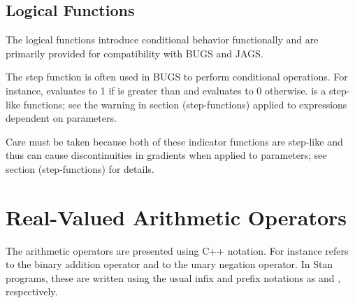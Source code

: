 \begin{description}
{\subsection{Logical Functions}


The logical functions introduce conditional behavior functionally and are primarily provided for compatibility with BUGS and JAGS.


\begin{description}    \end{description}


The step function is often used in BUGS to perform conditional operations.  For instance,  evaluates to 1 if  is greater than  and evaluates to 0 otherwise.  is a step-like functions; see the warning in section \@ref(step-functions) applied to expressions dependent on parameters.


\begin{description}    \end{description}


\begin{description}    \end{description}


Care must be taken because both of these indicator functions are step-like and thus can cause discontinuities in gradients when applied to parameters; see section \@ref(step-functions) for details.


\section{Real-Valued Arithmetic Operators}\label{real-valued-arithmetic-operators.section}


The arithmetic operators are presented using  C++ notation.  For instance  refers to the binary addition operator and  to the unary negation operator.  In Stan programs, these are written using the usual infix and prefix notations as  and , respectively.


}
\end{description}
